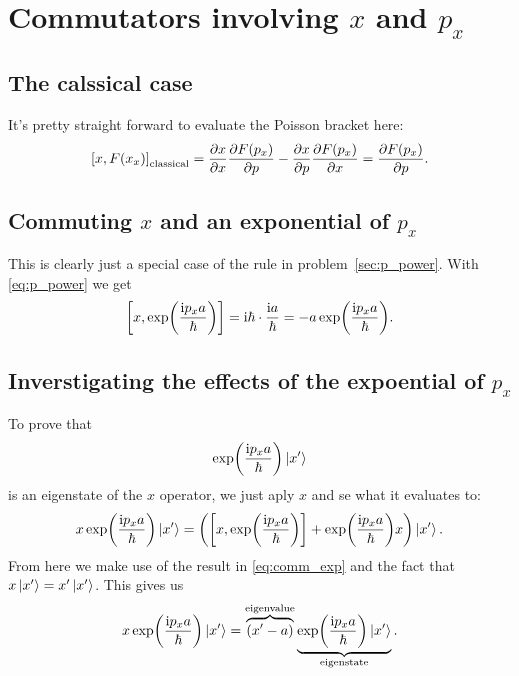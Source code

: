 \documentclass[11pt,letter, swedish, english
]{article}
\begin{document}
\section{Commutators involving $x$ and $p_x$}

\subsection{The calssical case}
It's pretty straight forward to evaluate the Poisson bracket here:
\begin{equation}
\comm{x}{F(x_x)}_\text{classical} 
= \pdv{x}{x}\pdv{F(p_x)}{p} - \pdv{x}{p}\pdv{F(p_x)}{x} 
= \pdv{F(p_x)}{p}.
\end{equation}

\subsection{Commuting $x$ and an exponential of $p_x$}
This is clearly just a special case of the rule in
problem~\ref{sec:p_power}. With \eqref{eq:p_power} we get
\begin{equation} \label{eq:comm_exp}
\comm{x}{\exp(\frac{\ii p_xa}{\hbar})} 
= \ii\hbar \cdot \frac{\ii a}{\hbar} = -a \exp(\frac{\ii p_xa}{\hbar}).
\end{equation}

\subsection{Inverstigating the effects of the expoential of $p_x$}
To prove that
\begin{equation}
\exp(\frac{\mathrm{i} p_xa}{\hbar})\ket{x'}
\end{equation}
is an eigenstate of the $x$ operator, we just aply $x$ and se what it
evaluates to:
\begin{equation}
x\exp(\frac{\ii p_xa}{\hbar})\ket{x'} 
= \left( \comm{x}{\exp(\frac{\ii p_xa}{\hbar})} 
+\exp(\frac{\ii p_xa}{\hbar}) x \right)\ket{x'}.
\end{equation}
From here we make use of the result in \eqref{eq:comm_exp} and the
fact that $x\ket{x'}=x'\ket{x'}$. This gives us
\begin{equation}
x\exp(\frac{\mathrm{i} p_xa}{\hbar})\ket{x'} 
= \overbrace{(x'-a)}^\text{eigenvalue}
  \underbrace{\exp(\frac{\mathrm{i} p_xa}{\hbar})\ket{x'}}_\text{eigenstate}.
\end{equation}
\end{document}
